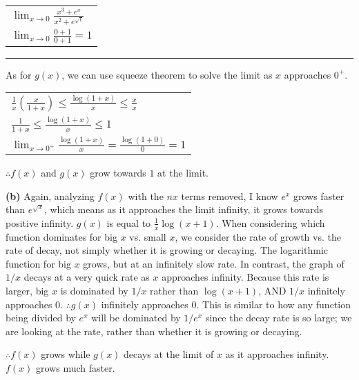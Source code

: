 \documentclass[answers,addpoints]{exam}
\begin{document}
\begin{questions}
\begin{solution}
\begin{center}
\begin{tabular}{@{}l@{}}
$\displaystyle \lim_{x \to 0}\frac{x^3+e^x}{x^2+e^{\sqrt{1}}}$ \\[10pt]
$\displaystyle \lim_{x \to 0}\frac{0+1}{0+1} = 1$ \\[6pt]
\end{tabular}
\end{center}

\hrule

As for $g(x)$, we can use squeeze theorem to solve the limit as $x$ approaches $0^+$.

\begin{center}
\begin{tabular}{@{}l@{}}
$\displaystyle \frac{1}{x} (\frac{x}{1+x}) \le \frac{\log(1+x)}{x} \le \frac{x}{x}$ \\[6pt]
$\displaystyle \frac{1}{1+x} \le \frac{\log(1+x)}{x} \le 1$ \\[6pt]
$\displaystyle \lim_{x \to 0^{+}} \frac{\log(1+x)}{x} = \frac{\log(1+0)}{0} = 1$ \\[6pt]
\end{tabular}
\end{center}

$\therefore f(x)$ and $g(x)$ grow towards $1$ at the limit.

\textbf{(b)}
Again, analyzing $f(x)$ with the $nx$ terms removed, I know $e^x$ grows faster than $e^{\sqrt{x}}$, which means as it approaches the limit infinity, it grows towards positive infinity. $g(x)$ is equal to $\frac{1}{x}\log(x+1)$. When considering which function dominates for big $x$ vs. small $x$, we consider the rate of growth vs. the rate of decay, not simply whether it is growing or decaying. The logarithmic function for big $x$ grows, but at an infinitely slow rate. In contrast, the graph of $1/x$ decays at a very quick rate as $x$ approaches infinity. Because this rate is larger, big $x$ is dominated by $1/x$ rather than $\log(x+1)$, AND $1/x$ infinitely approaches $0$. $\therefore g(x)$ infinitely approaches $0$. This is similar to how any function being divided by $e^x$ will be dominated by $1/e^x$ since the decay rate is so large; we are looking at the rate, rather than whether it is growing or decaying.

$\therefore f(x)$ grows while $g(x)$ decays at the limit of $x$ as it approaches infinity. $f(x)$ grows much faster.

\end{solution}


\end{questions}
\end{document}
